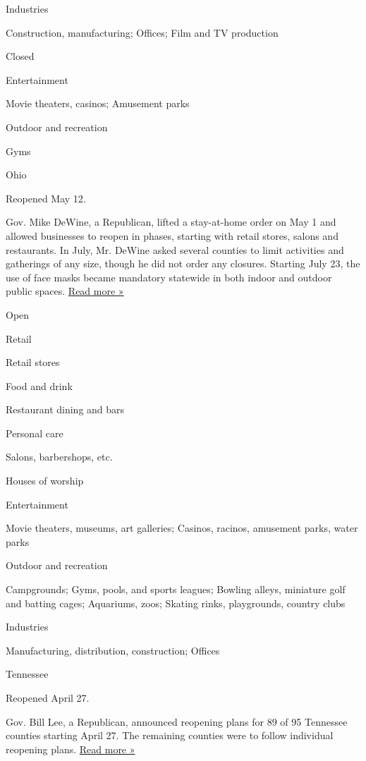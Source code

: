 Industries

Construction, manufacturing; Offices; Film and TV production

Closed

Entertainment

Movie theaters, casinos; Amusement parks

Outdoor and recreation

Gyms

Ohio

Reopened May 12.

Gov. Mike DeWine, a Republican, lifted a stay-at-home order on May 1 and
allowed businesses to reopen in phases, starting with retail stores,
salons and restaurants. In July, Mr. DeWine asked several counties to
limit activities and gatherings of any size, though he did not order any
closures. Starting July 23, the use of face masks became mandatory
statewide in both indoor and outdoor public spaces.
\href{https://www.news5cleveland.com/news/state/ohio-gov-mike-dewine-announces-statewide-mask-mandate-effective-thursday}{Read
more »}

Open

Retail

Retail stores

Food and drink

Restaurant dining and bars

Personal care

Salons, barbershops, etc.

Houses of worship

Entertainment

Movie theaters, museums, art galleries; Casinos, racinos, amusement
parks, water parks

Outdoor and recreation

Campgrounds; Gyms, pools, and sports leagues; Bowling alleys, miniature
golf and batting cages; Aquariums, zoos; Skating rinks, playgrounds,
country clubs

Industries

Manufacturing, distribution, construction; Offices

Tennessee

Reopened April 27.

Gov. Bill Lee, a Republican, announced reopening plans for 89 of 95
Tennessee counties starting April 27. The remaining counties were to
follow individual reopening plans.
\href{https://www.wsmv.com/news/tennessee-releases-new-guidelines-for-reopening-restaurants-retail-and-large-attractions/article_0f74cd22-9ad3-11ea-9f03-e3784e1e4029.html}{Read
more »}

